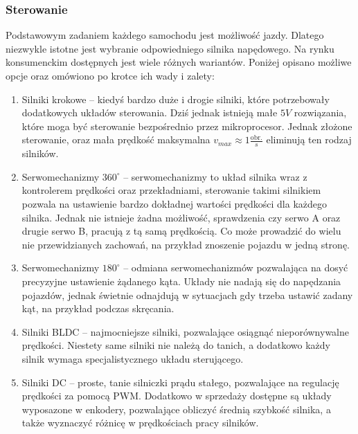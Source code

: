         \subsubsection{Sterowanie}
        \label{sec:engines}
            Podstawowym zadaniem każdego samochodu jest możliwość jazdy.
            Dlatego niezwykle istotne jest wybranie odpowiedniego silnika napędowego.
            Na rynku konsumenckim dostępnych jest wiele różnych wariantów.
            Poniżej opisano możliwe opcje oraz omówiono po krotce ich wady i zalety:
            \begin{enumerate}
                \item Silniki krokowe -- kiedyś bardzo duże i drogie silniki, które potrzebowały dodatkowych układów sterowania.
                Dziś jednak istnieją małe $5V$ rozwiązania, które moga być sterowanie bezpośrednio przez mikroprocesor.
                Jednak złożone sterowanie, oraz mała prędkość maksymalna $v_{max} \approx 1 \frac{\text{obr.}}{s}$ eliminują ten rodzaj silników.
                \item Serwomechanizmy $360^\circ$ -- serwomechanizmy to układ silnika wraz z kontrolerem prędkości oraz przekładniami, sterowanie takimi silnikiem pozwala na ustawienie bardzo dokładnej wartości prędkości dla każdego silnika.
                Jednak nie istnieje żadna możliwość, sprawdzenia czy serwo A oraz drugie serwo B, pracują z tą samą prędkością. Co może prowadzić do wielu nie przewidzianych zachowań, na przykład znoszenie pojazdu w jedną stronę.
                \item Serwomechanizmy $180^\circ$ -- odmiana serwomechanizmów pozwalająca na dosyć precyzyjne ustawienie żądanego kąta.
                Układy nie nadają się do napędzania pojazdów, jednak świetnie odnajdują w sytuacjach gdy trzeba ustawić zadany kąt, na przykład podczas skręcania.
                \item Silniki BLDC -- najmocniejsze silniki, pozwalające osiągnąć nieporównywalne prędkości.
                Niestety same silniki nie należą do tanich, a dodatkowo każdy silnik wymaga specjalistycznego układu sterującego.
                \item Silniki DC -- proste, tanie silniczki prądu stałego, pozwalające na regulację prędkości za pomocą PWM.
                Dodatkowo w sprzedaży dostępne są układy wyposazone w enkodery, pozwalające obliczyć średnią szybkość silnika,
                a także wyznaczyć różnicę w prędkościach pracy silników.
            \end{enumerate}
